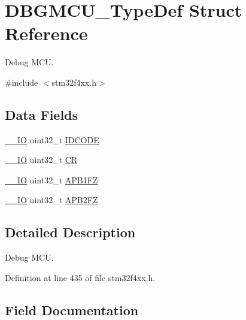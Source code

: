\hypertarget{struct_d_b_g_m_c_u___type_def}{}\section{D\+B\+G\+M\+C\+U\+\_\+\+Type\+Def Struct Reference}
\label{struct_d_b_g_m_c_u___type_def}


Debug M\+CU.  




{\ttfamily \#include $<$stm32f4xx.\+h$>$}

\subsection*{Data Fields}
\begin{DoxyCompactItemize}
\item 
\hyperlink{group___c_m_s_i_s__core__definitions_gaec43007d9998a0a0e01faede4133d6be}{\+\_\+\+\_\+\+IO} uint32\+\_\+t \hyperlink{struct_d_b_g_m_c_u___type_def_a24df28d0e440321b21f6f07b3bb93dea}{I\+D\+C\+O\+DE}
\item 
\hyperlink{group___c_m_s_i_s__core__definitions_gaec43007d9998a0a0e01faede4133d6be}{\+\_\+\+\_\+\+IO} uint32\+\_\+t \hyperlink{struct_d_b_g_m_c_u___type_def_ab40c89c59391aaa9d9a8ec011dd0907a}{CR}
\item 
\hyperlink{group___c_m_s_i_s__core__definitions_gaec43007d9998a0a0e01faede4133d6be}{\+\_\+\+\_\+\+IO} uint32\+\_\+t \hyperlink{struct_d_b_g_m_c_u___type_def_a5eaefc557573ae7bdc632ef6b6d574b5}{A\+P\+B1\+FZ}
\item 
\hyperlink{group___c_m_s_i_s__core__definitions_gaec43007d9998a0a0e01faede4133d6be}{\+\_\+\+\_\+\+IO} uint32\+\_\+t \hyperlink{struct_d_b_g_m_c_u___type_def_a4628a8c32f97ef93b15b2b503ef90c75}{A\+P\+B2\+FZ}
\end{DoxyCompactItemize}


\subsection{Detailed Description}
Debug M\+CU. 

Definition at line 435 of file stm32f4xx.\+h.



\subsection{Field Documentation}
\mbox{\label{struct_d_b_g_m_c_u___type_def_a5eaefc557573ae7bdc632ef6b6d574b5}} 
